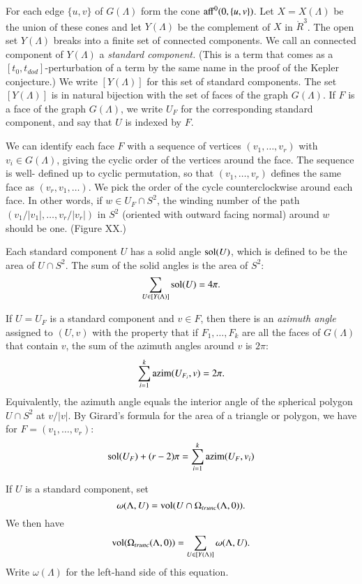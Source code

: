 For each edge $\{u,v\}$ of $G(\Lambda)$ form the cone
${\operatorname{aff}}^0(0,\{u,v\})$.  Let $X=X(\Lambda)$ be the union of these
cones and let $Y(\Lambda)$ be the complement of $X$ in $\ring{R}^3$.
The open set $Y(\Lambda)$ breaks into a finite set of connected
components.  We call an connected component of $Y(\Lambda)$
a {\it standard component.}  (This is a term that comes
as a $[t_0,t_{dod}]$-perturbation of a term by the same name
in the proof of the Kepler conjecture.)
We write $[Y(\Lambda)]$ for this set of standard
components.  The set $[Y(\Lambda)]$ is in natural bijection with
the set of faces of the graph $G(\Lambda)$.  If $F$ is a face
of the graph $G(\Lambda)$, we write $U_F$ for the corresponding
standard component, and say that $U$ is indexed by $F$.

We can identify each face $F$ with a sequence of vertices
$(v_1,\ldots,v_r)$ with $v_i\in G(\Lambda)$, giving the cyclic
order of the vertices around the face.  The sequence is well-
defined up to cyclic permutation, so that $(v_1,\ldots,v_r)$
defines the same face as $(v_r,v_1,\ldots)$.  We pick the
order of the cycle counterclockwise around each face.  
In other words, if $w\in U_F\cap S^2$, the winding number
of the path $(v_1/|v_1|,\ldots,v_r/|v_r|)$ in $S^2$ 
(oriented with outward
facing normal) around
$w$ should be one.  (Figure XX.)



Each standard component $U$ has a solid angle $\operatorname{sol}(U)$, which
is defined to be the area of $U\cap S^2$.  The sum of the
solid angles is the area of $S^2$:
 $$
 \sum_{U\in[Y(\Lambda)]} \operatorname{sol}(U) = 4\pi.
 $$

If $U=U_F$ is a standard component and $v\in F$, then there
is an {\it azimuth angle} assigned to $(U,v)$ with the property
that if $F_1,\ldots,F_k$ are all the faces of $G(\Lambda)$
that contain $v$, the sum of the azimuth angles around
$v$ is $2\pi$:
  $$
  \sum_{i=1}^k {\operatorname{azim}}(U_{F_i},v) = 2\pi.
  $$
Equivalently, 
the azimuth angle equals the interior angle of the spherical
polygon $U\cap S^2$ at $v/|v|$.  By Girard's formula for
the area of a triangle or polygon, we have for
$F = (v_1,\ldots,v_r)$:
  $$
  \operatorname{sol}(U_F) + (r-2)\pi = \sum_{i=1}^k {\operatorname{azim}}(U_F,v_i)
  $$

If $U$ is a standard component, set
  $$\omega(\Lambda,U) = {\operatorname{vol}}(U\cap \Omega_{trunc}(\Lambda,0)).$$
We then have
  $${\operatorname{vol}}(\Omega_{trunc}(\Lambda,0)) = 
  \sum_{U\in[Y(\Lambda)]} \omega(\Lambda,U).$$
Write $\omega(\Lambda)$ for the left-hand side of this equation.

